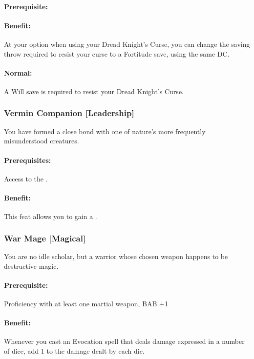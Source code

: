 \paragraph{Prerequisite:} 
\paragraph{Benefit:} At your option when using your Dread Knight's Curse, you can change the saving throw required to resist your curse to a Fortitude save, using the same DC.
\paragraph{Normal:} A Will save is required to resist your Dread Knight's Curse.

\subsubsection[Vermin Companion]{Vermin Companion [Leadership]}
\label{Feat:VerminCompanion}
You have formed a close bond with one of nature's more frequently misunderstood creatures.

\paragraph{Prerequisites:} Access to the .

\paragraph{Benefit:} This feat allows you to gain a .

\subsubsection[War Mage]{War Mage [Magical]}
\label{Feat:WarMage}
You are no idle scholar, but a warrior whose chosen weapon happens to be destructive magic.

\paragraph{Prerequisite:} Proficiency with at least one martial weapon, BAB +1

\paragraph{Benefit:} Whenever you cast an Evocation spell that deals damage expressed in a number of dice, add 1 to the damage dealt by each die. 